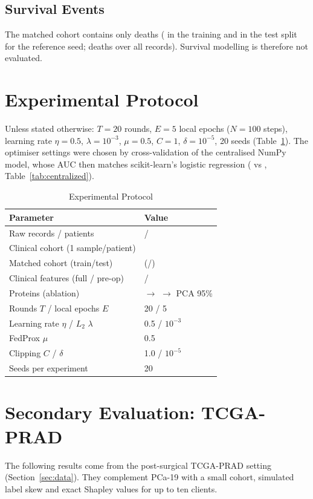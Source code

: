 \documentclass[journal]{IEEEtran}
\begin{document}
\subsection{Survival Events}
The matched cohort contains only \nEvents{} deaths (\nEventsTrain{} in the training and \nEventsTest{} in the test split for the reference seed; \nEventsAll{} deaths over all \nRaw{} records). Survival modelling is therefore not evaluated.

\section{Experimental Protocol}
Unless stated otherwise: $T=20$ rounds, $E=5$ local epochs ($N=100$ steps), learning rate $\eta=0.5$, $\lambda=10^{-3}$, $\mu=0.5$, $C=1$, $\delta=10^{-5}$, 20 seeds (Table~\ref{tab:protocol}). The optimiser settings were chosen by cross-validation of the centralised NumPy model, whose AUC then matches scikit-learn's logistic regression (\cvFull{} vs \cvSkFull{}, Table~\ref{tab:centralized}).

\begin{table}[ht]
\caption{Experimental Protocol}
\centering
\footnotesize
\begin{tabular}{ll}
\toprule
Parameter & Value \\
\midrule
Raw records / patients & \nRaw{} / \nRawPatients{} \\
Clinical cohort (1 sample/patient) & \nClinical{} \\
Matched cohort (train/test) & \nMatched{} (\nTrain{}/\nTest{}) \\
Clinical features (full / pre-op) & \nFeatFull{} / \nFeatPreop{} \\
Proteins (ablation) & \nProteinRaw{} $\to$ \nProteinKept{} $\to$ PCA 95\% \\
Rounds $T$ / local epochs $E$ & 20 / 5 \\
Learning rate $\eta$ / $L_2$ $\lambda$ & 0.5 / $10^{-3}$ \\
FedProx $\mu$ & 0.5 \\
Clipping $C$ / $\delta$ & 1.0 / $10^{-5}$ \\
Seeds per experiment & 20 \\
\bottomrule
\end{tabular}
\label{tab:protocol}
\end{table}





\section{Secondary Evaluation: TCGA-PRAD}
The following results come from the post-surgical TCGA-PRAD setting (Section~\ref{sec:data}). They complement PCa-19 with a small cohort, simulated label skew and exact Shapley values for up to ten clients.
\end{document}
